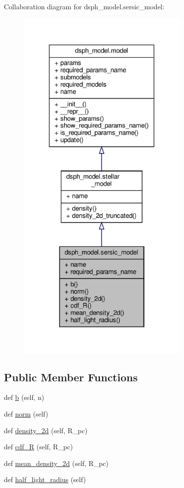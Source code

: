 Collaboration diagram for dsph\+\_\+model.\+sersic\+\_\+model\+:\nopagebreak
\begin{figure}[H]
\begin{center}
\leavevmode
\includegraphics[width=241pt]{dd/d39/classdsph__model_1_1sersic__model__coll__graph}
\end{center}
\end{figure}
\subsection*{Public Member Functions}
\begin{DoxyCompactItemize}
\item 
def \hyperlink{classdsph__model_1_1sersic__model_a13e1833567fab6c27dfc49cb80eab9a3}{b} (self, n)
\item 
def \hyperlink{classdsph__model_1_1sersic__model_a9af6c3cabf132205c55129bc28b9d867}{norm} (self)
\item 
def \hyperlink{classdsph__model_1_1sersic__model_afd0e257748b9a1b46c2f5443e3214523}{density\+\_\+2d} (self, R\+\_\+pc)
\item 
def \hyperlink{classdsph__model_1_1sersic__model_a68a272af30ef7e30ddaa70b076dc2818}{cdf\+\_\+R} (self, R\+\_\+pc)
\item 
def \hyperlink{classdsph__model_1_1sersic__model_a52fb76f30a58833cc14b3c9878ac9b56}{mean\+\_\+density\+\_\+2d} (self, R\+\_\+pc)
\item 
def \hyperlink{classdsph__model_1_1sersic__model_a555bceba3036d02a71218318516bba8a}{half\+\_\+light\+\_\+radius} (self)
\end{DoxyCompactItemize}

